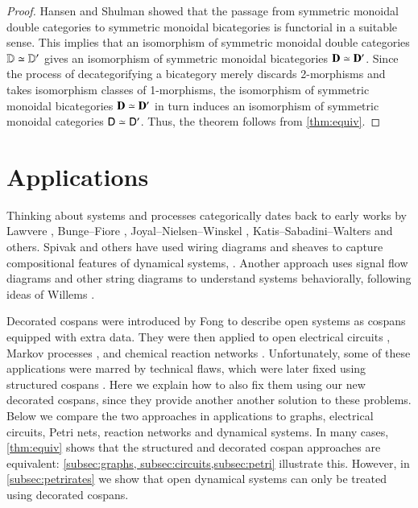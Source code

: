 \documentclass[reqno]{amsart}
\begin{document}
\begin{proof} 
Hansen and Shulman \cite{HS} showed that the passage from symmetric monoidal double categories to symmetric monoidal bicategories is functorial in a suitable sense.  This implies that an isomorphism of symmetric monoidal double categories $\mathbf{\mathbb D} \simeq \mathbf{\mathbb D}'$ gives an isomorphism of symmetric monoidal bicategories $\mathbf{D} \simeq \mathbf{D}'$.    Since the process of decategorifying a bicategory merely discards 2-morphisms and takes isomorphism classes of 1-morphisms, the isomorphism of symmetric monoidal bicategories $\mathbf{D} \simeq \mathbf{D}'$ in turn induces an isomorphism of symmetric monoidal categories $\mathsf{D} \simeq \mathsf{D}'$.   Thus, the theorem follows from \cref{thm:equiv}. \end{proof}

\section{Applications}\label{Applications}

Thinking about systems and processes categorically dates back to early works by Lawvere \cite{Lawvere}, Bunge--Fiore \cite{BungeFiore}, Joyal--Nielsen--Winskel \cite{JNW}, Katis--Sabadini--Walters \cite{KSW} and others.   Spivak and others have used wiring diagrams and sheaves to capture compositional features of dynamical systems, \cite{BFV,SSV,VSL}.  Another approach uses signal flow diagrams and other string diagrams \cite{BE,BSZ,FRS} to understand systems behaviorally, following ideas of Willems \cite{Willems}.  
 
Decorated cospans were introduced by Fong \cite{Fong,FongThesis} to describe open systems as cospans equipped with extra data.  They were then applied to open electrical circuits \cite{BF}, Markov processes \cite{BFP}, and chemical reaction networks \cite{BP}.  Unfortunately, some of these applications were marred by technical flaws, which were later fixed using structured cospans \cite{BC}. Here we explain how to also fix them using our new decorated cospans, since they provide another another solution to these problems. Below we compare the two approaches in applications to graphs, electrical circuits, Petri nets, reaction networks and dynamical systems. In many cases, \cref{thm:equiv} shows that the structured and decorated cospan approaches are equivalent: \cref{subsec:graphs, subsec:circuits,subsec:petri} illustrate this. However, in \cref{subsec:petrirates} we show that open dynamical systems can only be treated using decorated cospans.
\end{document}
